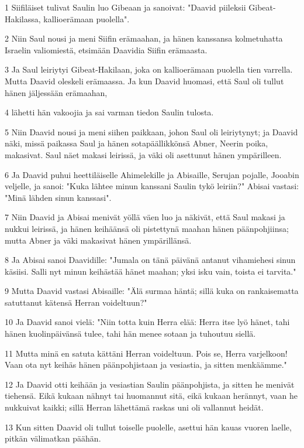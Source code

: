 \par 1 Siifiläiset tulivat Saulin luo Gibeaan ja sanoivat: "Daavid piileksii Gibeat-Hakilassa, kallioerämaan puolella".
\par 2 Niin Saul nousi ja meni Siifin erämaahan, ja hänen kanssansa kolmetuhatta Israelin valiomiestä, etsimään Daavidia Siifin erämaasta.
\par 3 Ja Saul leiriytyi Gibeat-Hakilaan, joka on kallioerämaan puolella tien varrella. Mutta Daavid oleskeli erämaassa. Ja kun Daavid huomasi, että Saul oli tullut hänen jäljessään erämaahan,
\par 4 lähetti hän vakoojia ja sai varman tiedon Saulin tulosta.
\par 5 Niin Daavid nousi ja meni siihen paikkaan, johon Saul oli leiriytynyt; ja Daavid näki, missä paikassa Saul ja hänen sotapäällikkönsä Abner, Neerin poika, makasivat. Saul näet makasi leirissä, ja väki oli asettunut hänen ympärilleen.
\par 6 Ja Daavid puhui heettiläiselle Ahimelekille ja Abisaille, Serujan pojalle, Jooabin veljelle, ja sanoi: "Kuka lähtee minun kanssani Saulin tykö leiriin?" Abisai vastasi: "Minä lähden sinun kanssasi".
\par 7 Niin Daavid ja Abisai menivät yöllä väen luo ja näkivät, että Saul makasi ja nukkui leirissä, ja hänen keihäänsä oli pistettynä maahan hänen päänpohjiinsa; mutta Abner ja väki makasivat hänen ympärillänsä.
\par 8 Ja Abisai sanoi Daavidille: "Jumala on tänä päivänä antanut vihamiehesi sinun käsiisi. Salli nyt minun keihästää hänet maahan; yksi isku vain, toista ei tarvita."
\par 9 Mutta Daavid vastasi Abisaille: "Älä surmaa häntä; sillä kuka on rankaisematta satuttanut kätensä Herran voideltuun?"
\par 10 Ja Daavid sanoi vielä: "Niin totta kuin Herra elää: Herra itse lyö hänet, tahi hänen kuolinpäivänsä tulee, tahi hän menee sotaan ja tuhoutuu siellä.
\par 11 Mutta minä en satuta kättäni Herran voideltuun. Pois se, Herra varjelkoon! Vaan ota nyt keihäs hänen päänpohjistaan ja vesiastia, ja sitten menkäämme."
\par 12 Ja Daavid otti keihään ja vesiastian Saulin päänpohjista, ja sitten he menivät tiehensä. Eikä kukaan nähnyt tai huomannut sitä, eikä kukaan herännyt, vaan he nukkuivat kaikki; sillä Herran lähettämä raskas uni oli vallannut heidät.
\par 13 Kun sitten Daavid oli tullut toiselle puolelle, asettui hän kauas vuoren laelle, pitkän välimatkan päähän.
